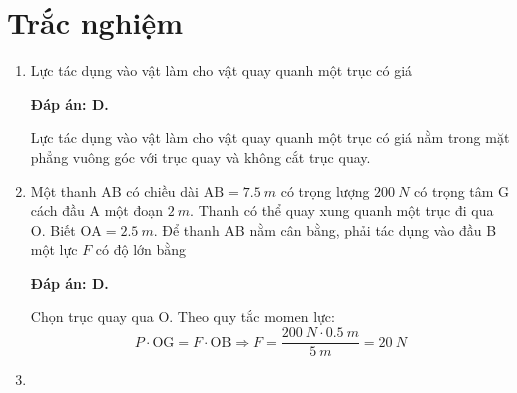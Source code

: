 \whiteBGstarBegin
\setcounter{section}{0}
\section{Trắc nghiệm}
\begin{enumerate}[label=\bfseries Câu \arabic*:]
	
	\item {}
	
	\cauhoi
	{Lực tác dụng vào vật làm cho vật quay quanh một trục có giá
	}
	
	\loigiai
	{	\textbf{Đáp án: D.}
		
		Lực tác dụng vào vật làm cho vật quay quanh một trục có giá nằm trong mặt phẳng vuông góc với trục quay và không cắt trục quay.
	}
	
	\item {}
	
	\cauhoi
	{Một thanh AB có chiều dài $\text{AB} = \SI{7.5}{m}$ có trọng lượng $\SI{200}{N}$ có trọng tâm G cách đầu A một đoạn $\SI{2}{m}$. Thanh có thể quay xung quanh một trục đi qua O. Biết $\text{OA} = \SI{2.5}{m}$. Để thanh AB nằm cân bằng, phải tác dụng vào đầu B một lực $F$ có độ lớn bằng
	}
	
	\loigiai
	{	\textbf{Đáp án: D.}
		
	Chọn trục quay qua O. Theo quy tắc momen lực:
	$$P \cdot \text{OG} = F \cdot \text{OB} \Rightarrow F =\dfrac{\SI{200}{N} \cdot \SI{0.5}{m}}{\SI{5}{m}}= \SI{20}{N}$$
	
	}
	\item {}
	

\end{enumerate}
